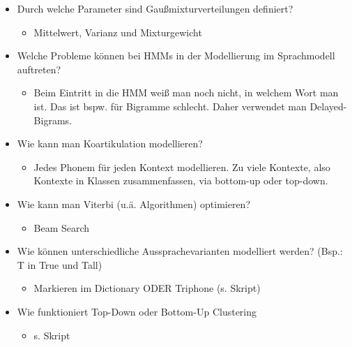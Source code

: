 \documentclass[11pt]{article}
\begin{document}
\begin{itemize}
\begin{itemize}
\end{itemize}
\item Durch welche Parameter sind Gaußmixturverteilungen definiert? 
\begin{itemize}
\item Mittelwert, Varianz und Mixturgewicht
\end{itemize}
\item Welche Probleme können bei HMMs in der Modellierung im Sprachmodell auftreten? 
\begin{itemize}
\item Beim Eintritt in die HMM weiß man noch nicht, in welchem Wort man ist. Das ist bspw. für Bigramme schlecht. Daher verwendet man Delayed-Bigrams.
\end{itemize}
\item Wie kann man Koartikulation modellieren? 
\begin{itemize}
\item Jedes Phonem für jeden Kontext modellieren. Zu viele Kontexte, also Kontexte in Klassen zusammenfassen, via bottom-up oder top-down.
\end{itemize}
\item Wie kann man Viterbi (u.ä. Algorithmen) optimieren? 
\begin{itemize}
\item Beam Search
\end{itemize}
\item Wie können unterschiedliche Aussprachevarianten modelliert werden? (Bsp.: T in True und Tall)
\begin{itemize}
\item Markieren im Dictionary ODER Triphone (s. Skript)
\end{itemize}
\item Wie funktioniert Top-Down oder Bottom-Up Clustering 
\begin{itemize}
\item s. Skript
\end{itemize}
\end{itemize}
\end{document}
